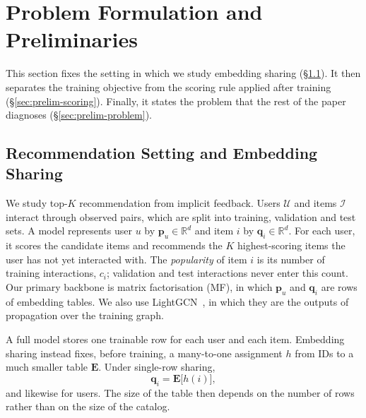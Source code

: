 \section{Problem Formulation and Preliminaries}
\label{sec:prelim}

This section fixes the setting in which we study embedding sharing (\S\ref{sec:prelim-setting}). It then separates the training objective from the scoring rule applied after training (\S\ref{sec:prelim-scoring}). Finally, it states the problem that the rest of the paper diagnoses (\S\ref{sec:prelim-problem}).

\subsection{Recommendation Setting and Embedding Sharing}
\label{sec:prelim-setting}

We study top-$K$ recommendation from implicit feedback. Users $\mathcal{U}$ and items $\mathcal{I}$ interact through observed pairs, which are split into training, validation and test sets. A model represents user $u$ by $\mathbf{p}_u\in\mathbb{R}^d$ and item $i$ by $\mathbf{q}_i\in\mathbb{R}^d$. For each user, it scores the candidate items and recommends the $K$ highest-scoring items the user has not yet interacted with. The \emph{popularity} of item $i$ is its number of training interactions, $c_i$; validation and test interactions never enter this count. Our primary backbone is matrix factorisation (MF), in which $\mathbf{p}_u$ and $\mathbf{q}_i$ are rows of embedding tables. We also use LightGCN~\cite{LightGCN}, in which they are the outputs of propagation over the training graph.

A full model stores one trainable row for each user and each item. Embedding sharing instead fixes, before training, a many-to-one assignment $h$ from IDs to a much smaller table $\mathbf{E}$. Under single-row sharing,
\begin{equation}
  \mathbf{q}_i=\mathbf{E}\bigl[h(i)\bigr],
  \label{eq:sharing}
\end{equation}
and likewise for users. The size of the table then depends on the number of rows rather than on the size of the catalog.

